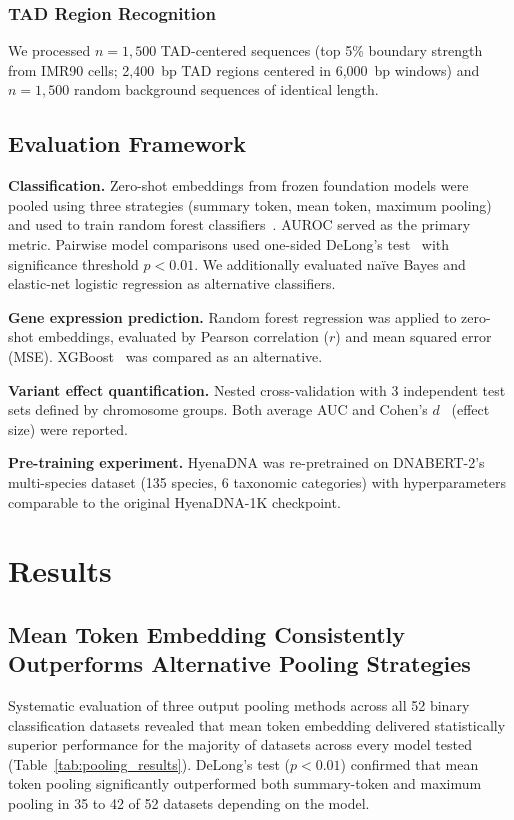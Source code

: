 \documentclass[11pt]{article}
\begin{document}
\subsubsection{TAD Region Recognition}
We processed $n = 1{,}500$ TAD-centered sequences (top 5\% boundary strength from IMR90 cells; 2,400~bp TAD regions centered in 6,000~bp windows) and $n = 1{,}500$ random background sequences of identical length.

\subsection{Evaluation Framework}

\textbf{Classification.} Zero-shot embeddings from frozen foundation models were pooled using three strategies (summary token, mean token, maximum pooling) and used to train random forest classifiers~\citep{breiman2001random}. AUROC served as the primary metric. Pairwise model comparisons used one-sided DeLong's test~\citep{delong1988comparing} with significance threshold $p < 0.01$. We additionally evaluated na\"ive Bayes and elastic-net logistic regression as alternative classifiers.

\textbf{Gene expression prediction.} Random forest regression was applied to zero-shot embeddings, evaluated by Pearson correlation ($r$) and mean squared error (MSE). XGBoost~\citep{chen2016xgboost} was compared as an alternative.

\textbf{Variant effect quantification.} Nested cross-validation with 3 independent test sets defined by chromosome groups. Both average AUC and Cohen's $d$~\citep{cohen1988statistical} (effect size) were reported.

\textbf{Pre-training experiment.} HyenaDNA was re-pretrained on DNABERT-2's multi-species dataset (135 species, 6 taxonomic categories) with hyperparameters comparable to the original HyenaDNA-1K checkpoint.

\section{Results}

\subsection{Mean Token Embedding Consistently Outperforms Alternative Pooling Strategies}

Systematic evaluation of three output pooling methods across all 52 binary classification datasets revealed that mean token embedding delivered statistically superior performance for the majority of datasets across every model tested (Table~\ref{tab:pooling_results}). DeLong's test ($p < 0.01$) confirmed that mean token pooling significantly outperformed both summary-token and maximum pooling in 35 to 42 of 52 datasets depending on the model.
\end{document}
